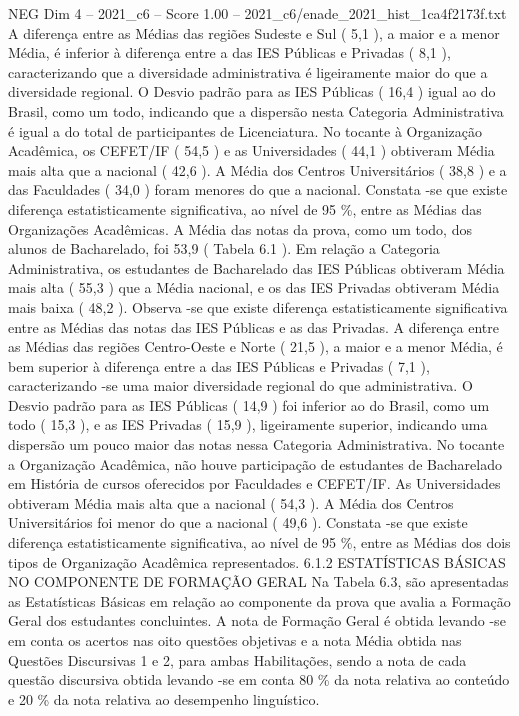 \begin{textsample}{NEG Dim 4 – 2021\_c6 – Score 1.00 – 2021\_c6/enade\_2021\_hist\_1ca4f2173f.txt}
A diferença entre as Médias das regiões Sudeste e Sul ( 5,1 ), a maior e a menor Média, é inferior à diferença entre a das IES Públicas e Privadas ( 8,1 ), caracterizando que a diversidade administrativa é ligeiramente maior do que a diversidade regional.
O Desvio padrão para as IES Públicas ( 16,4 ) igual ao do Brasil, como um todo, indicando que a dispersão nesta Categoria Administrativa é igual a do total de participantes de Licenciatura.
No tocante à Organização Acadêmica, os CEFET/IF ( 54,5 ) e as Universidades ( 44,1 ) obtiveram Média mais alta que a nacional ( 42,6 ).
A Média dos Centros Universitários ( 38,8 ) e a das Faculdades ( 34,0 ) foram menores do que a nacional.
Constata -se que existe diferença estatisticamente significativa, ao nível de 95 \%, entre as Médias das Organizações Acadêmicas.
A Média das notas da prova, como um todo, dos alunos de Bacharelado, foi 53,9 ( Tabela 6.1 ).
Em relação a Categoria Administrativa, os estudantes de Bacharelado das IES Públicas obtiveram Média mais alta ( 55,3 ) que a Média nacional, e os das IES Privadas obtiveram Média mais baixa ( 48,2 ).
Observa -se que existe diferença estatisticamente significativa entre as Médias das notas das IES Públicas e as das Privadas.
A diferença entre as Médias das regiões Centro-Oeste e Norte ( 21,5 ), a maior e a menor Média, é bem superior à diferença entre a das IES Públicas e Privadas ( 7,1 ), caracterizando -se uma maior diversidade regional do que administrativa.
O Desvio padrão para as IES Públicas ( 14,9 ) foi inferior ao do Brasil, como um todo ( 15,3 ), e as IES Privadas ( 15,9 ), ligeiramente superior, indicando uma dispersão um pouco maior das notas nessa Categoria Administrativa.
No tocante a Organização Acadêmica, não houve participação de estudantes de Bacharelado em História de cursos oferecidos por Faculdades e CEFET/IF.
As Universidades obtiveram Média mais alta que a nacional ( 54,3 ).
A Média dos Centros Universitários foi menor do que a nacional ( 49,6 ).
Constata -se que existe diferença estatisticamente significativa, ao nível de 95 \%, entre as Médias dos dois tipos de Organização Acadêmica representados. 6.1.2 ESTATÍSTICAS BÁSICAS NO COMPONENTE DE FORMAÇÃO GERAL Na Tabela 6.3, são apresentadas as Estatísticas Básicas em relação ao componente da prova que avalia a Formação Geral dos estudantes concluintes.
A nota de Formação Geral é obtida levando -se em conta os acertos nas oito questões objetivas e a nota Média obtida nas Questões Discursivas 1 e 2, para ambas Habilitações, sendo a nota de cada questão discursiva obtida levando -se em conta 80 \% da nota relativa ao conteúdo e 20 \% da nota relativa ao desempenho linguístico.

\end{textsample}
